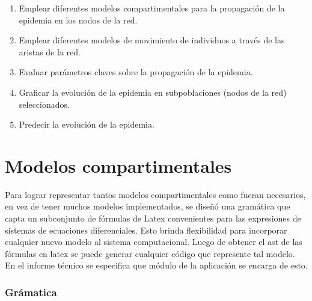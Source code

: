 \documentclass[a4paper,10pt,twocolumn]{article}
\begin{document}
\begin{enumerate}
	\item Emplear diferentes modelos compartimentales para la propagación de la epidemia en los nodos de la red.
	\item Emplear diferentes modelos de movimiento de individuos a través de las aristas de la red.
	\item Evaluar parámetros claves sobre la propagación de la epidemia.
	\item Graficar la evolución de la epidemia en subpoblaciones (nodos de la red) seleccionados.
	\item Predecir la evolución de la epidemia.
\end{enumerate}


\section{Modelos compartimentales}

Para lograr representar tantos modelos compartimentales como fueran necesarios, en vez de tener muchos modelos implementados, se dise\~n\'o una gram\'atica que  capta un subconjunto de f\'ormulas de Latex convenientes para las expresiones de sistemas de ecuaciones diferenciales. Esto brinda flexibilidad para incorporar cualquier nuevo modelo al sistema computacional. Luego de obtener el ast de las f\'ormulas en latex se puede generar cualquier c\'odigo que represente tal modelo. En el informe t\'ecnico se especifica que m\'odulo de la aplicaci\'on se encarga de esto.

\subsubsection*{Gr\'amatica}

\end{document}

